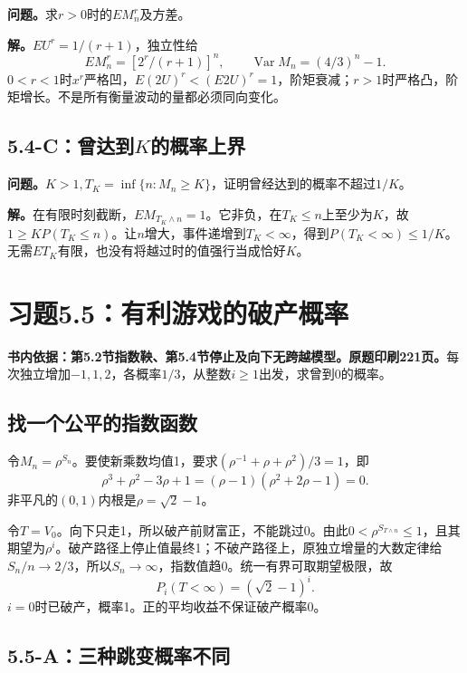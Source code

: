 \documentclass[11pt,a4paper,UTF8,fontset=fandol]{ctexart}
\begin{document}
\textbf{问题。}求\(r>0\)时的\(EM_n^r\)及方差。

\textbf{解。}\(EU^r=1/(r+1)\)，独立性给
\[\boxed{EM_n^r=[2^r/(r+1)]^n,\qquad\operatorname{Var}M_n=(4/3)^n-1.}\]
\(0<r<1\)时\(x^r\)严格凹，\(E(2U)^r<(E2U)^r=1\)，阶矩衰减；\(r>1\)时严格凸，阶矩增长。不是所有衡量波动的量都必须同向变化。

\subsection{\texorpdfstring{5.4-C：曾达到\(K\)的概率上界}{5.4-C：曾达到K的概率上界}}\label{cux66feux8fbeux5230kux7684ux6982ux7387ux4e0aux754c}

\textbf{问题。}\(K>1,T_K=\inf\{n:M_n\ge K\}\)，证明曾经达到的概率不超过\(1/K\)。

\textbf{解。}在有限时刻截断，\(EM_{T_K\wedge n}=1\)。它非负，在\(T_K\le n\)上至少为\(K\)，故\(1\ge K P(T_K\le n)\)。让\(n\)增大，事件递增到\(T_K<\infty\)，得到\(\boxed{P(T_K<\infty)\le1/K}\)。无需\(ET_K\)有限，也没有将越过时的值强行当成恰好\(K\)。

\bigskip

\section{习题5.5：有利游戏的破产概率}\label{ux4e60ux98985.5ux6709ux5229ux6e38ux620fux7684ux7834ux4ea7ux6982ux7387}

\textbf{书内依据：第5.2节指数鞅、第5.4节停止及向下无跨越模型。原题印刷221页。}每次独立增加\(-1,1,2\)，各概率\(1/3\)，从整数\(i\ge1\)出发，求曾到0的概率。

\subsection{找一个公平的指数函数}\label{ux627eux4e00ux4e2aux516cux5e73ux7684ux6307ux6570ux51fdux6570}

令\(M_n=\rho^{S_n}\)。要使新乘数均值1，要求\((\rho^{-1}+\rho+\rho^2)/3=1\)，即
\[\rho^3+\rho^2-3\rho+1=(\rho-1)(\rho^2+2\rho-1)=0.\]
非平凡的\((0,1)\)内根是\(\rho=\sqrt2-1\)。

令\(T=V_0\)。向下只走1，所以破产前财富正，不能跳过0。由此\(0<\rho^{S_{T\wedge n}}\le1\)，且其期望为\(\rho^i\)。破产路径上停止值最终1；不破产路径上，原独立增量的大数定律给\(S_n/n\to2/3\)，所以\(S_n\to\infty\)，指数值趋0。统一有界可取期望极限，故
\[\boxed{P_i(T<\infty)=(\sqrt2-1)^i.}\]
\(i=0\)时已破产，概率1。正的平均收益不保证破产概率0。

\subsection{5.5-A：三种跳变概率不同}\label{aux4e09ux79cdux8df3ux53d8ux6982ux7387ux4e0dux540c}
\end{document}

